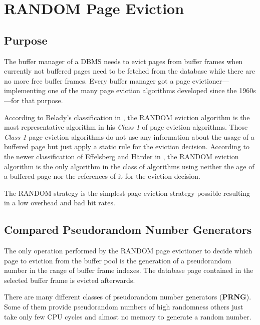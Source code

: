\chapter[RANDOM Page Eviction]{RANDOM Page Eviction} \label{ch:random}

\section[Purpose]{Purpose}

    The buffer manager of a DBMS needs to evict pages from buffer frames when currently not buffered pages need to be fetched from the database while there are no more free buffer frames. Every buffer manager got a page evictioner---implementing one of the many page eviction algorithms developed since the 1960s---for that purpose.

    According to Belady's classification in \cite{Belady:1966}, the RANDOM eviction algorithm is the most representative algorithm in his \textit{Class 1} of page eviction algorithms. Those \textit{Class 1} page eviction algorithms do not use any information about the usage of a buffered page but just apply a static rule for the eviction decision. According to the newer classification of Effelsberg and Härder in \cite{Effelsberg:1984}, the RANDOM eviction algorithm is the only algorithm in the class of algorithms using neither the age of a buffered page nor the references of it for the eviction decision.

    The RANDOM strategy is the simplest page eviction strategy possible resulting in a low overhead and bad hit rates.

\section[Compared Pseudorandom Number Generators]{Compared Pseudorandom Number Generators}

    The only operation performed by the RANDOM page evictioner to decide which page to eviction from the buffer pool is the generation of a pseudorandom number in the range of buffer frame indexes. The database page contained in the selected buffer frame is evicted afterwards.

    There are many different classes of pseudorandom number generators (\textbf{PRNG}). Some of them provide pseudorandom numbers of high randomness others just take only few CPU cycles and almost no memory to generate a random number.



